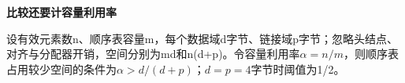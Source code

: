 {\color{ink}\bfseries 比较还要计容量利用率}\par\vspace{1bp}设有效元素数n、顺序表容量m，每个数据域d字节、链接域p字节；忽略头结点、对齐与分配器开销，空间分别为md和n(d+\allowbreak{}p)。令容量利用率\(\alpha =\allowbreak{}n/\allowbreak{}m\)，则顺序表占用较少空间的条件为\(\alpha >\allowbreak{}d/\allowbreak{}(d+\allowbreak{}p)\)；\(d=\allowbreak{}p=\allowbreak{}4\)字节时阈值为1/\allowbreak{}2。
